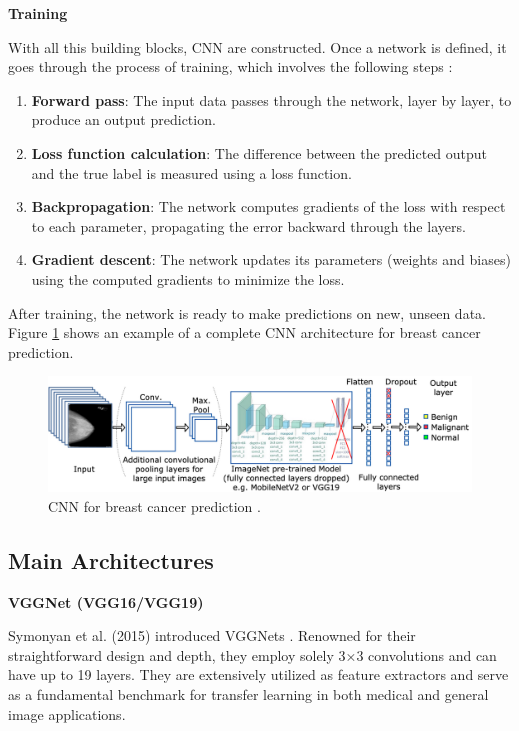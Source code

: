 \documentclass[a4paper,10pt]{book}
\begin{document}
\textbf{Training}

With all this building blocks, CNN are constructed. Once a network is defined, it goes through the process of training, which involves the following steps \cite{bergmann_what_2024}:

\begin{enumerate}
    \item \textbf{Forward pass}: The input data passes through the network, layer by layer, to produce an output prediction.
    \item \textbf{Loss function calculation}: The difference between the predicted output and the true label is measured using a loss function.
    \item  \textbf{Backpropagation}: The network computes gradients of the loss with respect to each parameter, propagating the error backward through the layers.
    \item \textbf{Gradient descent}: The network updates its parameters (weights and biases) using the computed gradients to minimize the loss.
\end{enumerate}

After training, the network is ready to make predictions on new, unseen data. Figure \ref{fig:cnn_breast} shows an example of a complete CNN architecture for breast cancer prediction.

\begin{figure}[h!]
    \centering
    \includegraphics[width=0.75\linewidth]{reports//assets/cnn_breast.png}
    \caption[Breast cancer CNN]{CNN for breast cancer prediction \cite{jaamour_divide_2023}.}
    \label{fig:cnn_breast}
\end{figure}

\subsection{Main Architectures}

\textbf{VGGNet (VGG16/VGG19)}

Symonyan et al. (2015) introduced VGGNets \cite{simonyanVeryDeepConvolutional}. Renowned for their straightforward design and depth, they employ solely 3×3 convolutions and can have up to 19 layers. They are extensively utilized as feature extractors and serve as a fundamental benchmark for transfer learning in both medical and general image applications.
\end{document}
